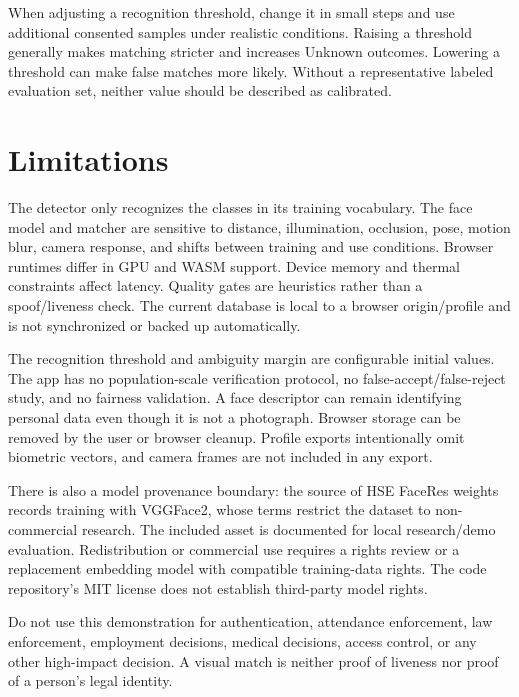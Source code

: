 \documentclass[11pt,oneside,openany]{report}
\begin{document}
When adjusting a recognition threshold, change it in small steps and use additional consented samples under realistic conditions. Raising a threshold generally makes matching stricter and increases Unknown outcomes. Lowering a threshold can make false matches more likely. Without a representative labeled evaluation set, neither value should be described as calibrated.

\section{Limitations}
The detector only recognizes the classes in its training vocabulary. The face model and matcher are sensitive to distance, illumination, occlusion, pose, motion blur, camera response, and shifts between training and use conditions. Browser runtimes differ in GPU and WASM support. Device memory and thermal constraints affect latency. Quality gates are heuristics rather than a spoof/liveness check. The current database is local to a browser origin/profile and is not synchronized or backed up automatically.

The recognition threshold and ambiguity margin are configurable initial values. The app has no population-scale verification protocol, no false-accept/false-reject study, and no fairness validation. A face descriptor can remain identifying personal data even though it is not a photograph. Browser storage can be removed by the user or browser cleanup. Profile exports intentionally omit biometric vectors, and camera frames are not included in any export.

There is also a model provenance boundary: the source of HSE FaceRes weights records training with VGGFace2, whose terms restrict the dataset to non-commercial research. The included asset is documented for local research/demo evaluation. Redistribution or commercial use requires a rights review or a replacement embedding model with compatible training-data rights. The code repository's MIT license does not establish third-party model rights.

\begin{cautionbox}
Do not use this demonstration for authentication, attendance enforcement, law enforcement, employment decisions, medical decisions, access control, or any other high-impact decision. A visual match is neither proof of liveness nor proof of a person's legal identity.
\end{cautionbox}
\end{document}
